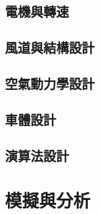 \documentclass[12pt]{article}       %
\begin{document}
\subsection{電機與轉速} 
\hspace{2em}


\subsection{風道與結構設計} 
\hspace{2em}


\subsection{空氣動力學設計} 
\hspace{2em}


\subsection{車體設計} 
\hspace{2em}


\subsection{演算法設計} 
\hspace{2em}


\section{\centering 模擬與分析}
\hspace{2em}
\end{document}
